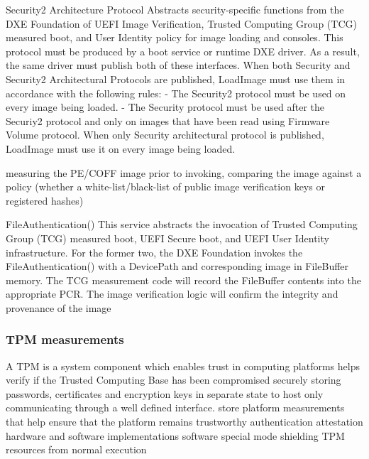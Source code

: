




Security2 Architecture Protocol
Abstracts security-specific functions from the DXE Foundation of UEFI Image Verification,
Trusted Computing Group (TCG) measured boot, and User Identity policy for image loading and
consoles. This protocol must be produced by a boot service or runtime DXE driver.
As a result, the same driver must publish both of these interfaces.
When both Security and Security2 Architectural Protocols are published, LoadImage must use
them in accordance with the following rules:
- The Security2 protocol must be used on every image being loaded.
- The Security protocol must be used after the Securiy2 protocol and only on images that have been read using Firmware Volume protocol.
When only Security architectural protocol is published, LoadImage must use it on every image
being loaded.

measuring the PE/COFF image prior to invoking, comparing the
image against a policy (whether a white-list/black-list of public image verification keys or registered hashes)

FileAuthentication()
This service abstracts the invocation of Trusted Computing Group (TCG) measured boot, UEFI
Secure boot, and UEFI User Identity infrastructure. For the former two, the DXE Foundation
invokes the FileAuthentication() with a DevicePath and corresponding image in
FileBuffer memory. The TCG measurement code will record the FileBuffer contents into the
appropriate PCR. The image verification logic will confirm the integrity and provenance of the
image


\subsubsection{TPM measurements}
A \acf{TPM} is a system component which enables trust in computing platforms
helps verify if the Trusted Computing Base has been compromised
securely storing passwords, certificates and encryption keys in separate state to host
only communicating through a well defined interface.
store platform measurements that help ensure that the platform remains trustworthy
authentication
attestation
hardware and software implementations
software special mode shielding TPM resources from normal execution
\cite{tcg-tpm-summary}
\cite{tcg-tpm-library-part1-architecture}

